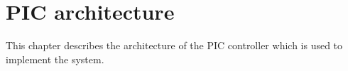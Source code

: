 \chapter{PIC architecture}
This chapter describes the architecture of the PIC controller which is used to implement the system.

